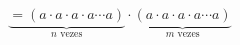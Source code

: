 \documentclass[preview]{standalone}
\begin{document}
\begin{align*}
\underbrace{=(a \cdot a \cdot a \cdot a \cdots a)}_{n \text{ vezes}} \cdot \underbrace{(a \cdot a \cdot a \cdot a \cdots a)}_{m \text{ vezes}}
\end{align*}
\end{document}
